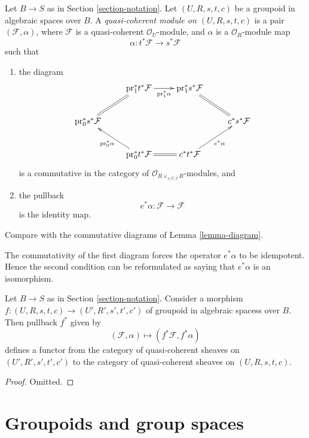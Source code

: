 \begin{definition}
\label{definition-groupoid-module}
Let $B \to S$ as in Section \ref{section-notation}.
Let $(U, R, s, t, c)$ be a groupoid in algebraic spaces over $B$.
A {\it quasi-coherent module on $(U, R, s, t, c)$}
is a pair $(\mathcal{F}, \alpha)$, where $\mathcal{F}$ is a quasi-coherent
$\mathcal{O}_U$-module, and $\alpha$ is a $\mathcal{O}_R$-module
map
$$
\alpha : t^*\mathcal{F} \longrightarrow s^*\mathcal{F}
$$
such that
\begin{enumerate}
\item the diagram
$$
\xymatrix{
& \text{pr}_1^*t^*\mathcal{F} \ar[r]_-{\text{pr}_1^*\alpha} &
\text{pr}_1^*s^*\mathcal{F} \ar@{=}[rd] & \\
\text{pr}_0^*s^*\mathcal{F} \ar@{=}[ru] & & & c^*s^*\mathcal{F} \\
& \text{pr}_0^*t^*\mathcal{F} \ar[lu]^{\text{pr}_0^*\alpha} \ar@{=}[r] &
c^*t^*\mathcal{F} \ar[ru]_{c^*\alpha}
}
$$
is a commutative in the category of
$\mathcal{O}_{R \times_{s, U, t} R}$-modules, and
\item the pullback
$$
e^*\alpha : \mathcal{F} \longrightarrow \mathcal{F}
$$
is the identity map.
\end{enumerate}
Compare with the commutative diagrams of Lemma \ref{lemma-diagram}.
\end{definition}

\noindent
The commutativity of the first diagram forces the operator $e^*\alpha$
to be idempotent. Hence the second condition can be reformulated as saying
that $e^*\alpha$ is an isomorphism.

\begin{lemma}
\label{lemma-pullback}
Let $B \to S$ as in Section \ref{section-notation}.
Consider a morphism
$f : (U, R, s, t, c) \to (U', R', s', t', c')$
of groupoid in algebraic spacess over $B$. Then pullback $f^*$ given by
$$
(\mathcal{F}, \alpha) \mapsto (f^*\mathcal{F}, f^*\alpha)
$$
defines a functor from the category of quasi-coherent sheaves on
$(U', R', s', t', c')$ to the category of quasi-coherent sheaves on
$(U, R, s, t, c)$.
\end{lemma}

\begin{proof}
Omitted.
\end{proof}






\section{Groupoids and group spaces}
\label{section-groupoids-group-spaces}

